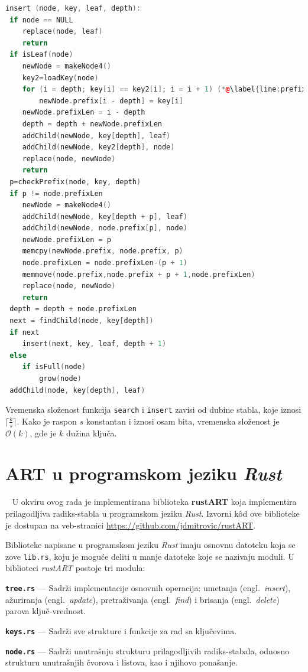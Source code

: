 \documentclass[12pt,oneside]{memoir}
\begin{document}
\begin{lstlisting}[language=C++,
                   caption={Algoritam umetanja novih elemenata u stablo},
                   label={kod:algoritam_insert}]
insert (node, key, leaf, depth):
 if node == NULL
    replace(node, leaf)
    return
 if isLeaf(node)
    newNode = makeNode4()
    key2=loadKey(node)
    for (i = depth; key[i] == key2[i]; i = i + 1) (*@\label{line:prefix_len}@*)
        newNode.prefix[i - depth] = key[i]
    newNode.prefixLen = i - depth
    depth = depth + newNode.prefixLen
    addChild(newNode, key[depth], leaf)
    addChild(newNode, key2[depth], node)
    replace(node, newNode)
    return
 p=checkPrefix(node, key, depth)
 if p != node.prefixLen
    newNode = makeNode4()
    addChild(newNode, key[depth + p], leaf)
    addChild(newNode, node.prefix[p], node)
    newNode.prefixLen = p
    memcpy(newNode.prefix, node.prefix, p)
    node.prefixLen = node.prefixLen-(p + 1)
    memmove(node.prefix,node.prefix + p + 1,node.prefixLen)
    replace(node, newNode)
    return
 depth = depth + node.prefixLen
 next = findChild(node, key[depth])
 if next
    insert(next, key, leaf, depth + 1)
 else
    if isFull(node)
        grow(node)
 addChild(node, key[depth], leaf)
\end{lstlisting}

Vremenska složenost funkcija \texttt{search} i \texttt{insert}
zavisi od dubine stabla, koje iznosi
$ \lceil \frac{k}{s} \rceil $. Kako je raspon $s$ konstantan i
iznosi osam bita, vremenska složenost je
$ \mathcal{O}(k) $, gde je $k$ dužina ključa.

\chapter{ART u programskom jeziku \textit{Rust}}~\label{ch:rustART}
U okviru ovog rada je implementirana biblioteka \textbf{rustART}
koja implementira prilagodljiva radiks-stabla u programskom
jeziku \textit{Rust}. Izvorni kôd ove biblioteke je dostupan na
veb-stranici \url{https://github.com/jdmitrovic/rustART}.

Biblioteke napisane u programskom jeziku \textit{Rust}
imaju osnovnu datoteku koja se zove \texttt{lib.rs},
koju je moguće deliti u manje datoteke koje se nazivaju
moduli. U biblioteci \textit{rustART} postoje
tri modula:

\begin{description}
  \item{\textbf{\texttt{tree.rs}}} --- Sadrži implementacije osnovnih operacija:
        umetanja (engl.\ \textit{insert}), ažuriranja (engl.\ \textit{update}),
        pretraživanja (engl.\ \textit{find}) i brisanja (engl.\ \textit{delete})
        parova ključ-vrednost.

  \item{\textbf{\texttt{keys.rs}}} --- Sadrži sve strukture i funkcije za rad sa ključevima.

  \item{\textbf{\texttt{node.rs}}} --- Sadrži unutrašnju strukturu prilagodljivih
        radiks-stabala, odnosno strukturu unutrašnjih čvorova i listova,
        kao i njihovo ponašanje.
\end{description}
\end{document}
